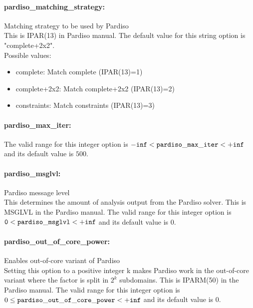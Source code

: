 \paragraph{pardiso\_matching\_strategy:}\label{sec:pardiso_matching_strategy} Matching strategy to be used by Pardiso $\;$ \\
 This is IPAR(13) in Pardiso manual.
The default value for this string option is "complete+2x2".
\\ 
Possible values:
\begin{itemize}
   \item complete: Match complete (IPAR(13)=1)
   \item complete+2x2: Match complete+2x2 (IPAR(13)=2)
   \item constraints: Match constraints (IPAR(13)=3)
\end{itemize}

\paragraph{pardiso\_max\_iter:}\label{sec:pardiso_max_iter}  $\;$ \\
 The valid range for this integer option is
${\tt -inf} <  {\tt pardiso\_max\_iter } <  {\tt +inf}$
and its default value is $500$.

\paragraph{pardiso\_msglvl:}\label{sec:pardiso_msglvl} Pardiso message level $\;$ \\
This determines the amount of analysis output from the Pardiso solver.
This is MSGLVL in the Pardiso manual.
 The valid range for this integer option is
${\tt 0} <  {\tt pardiso\_msglvl } <  {\tt +inf}$
and its default value is $0$.

\paragraph{pardiso\_out\_of\_core\_power:}\label{sec:pardiso_out_of_core_power} Enables out-of-core variant of Pardiso $\;$ \\
 Setting this option to a positive integer k makes
Pardiso work in the out-of-core variant where the
factor is split in $2^k$ subdomains.  This is
IPARM(50) in the Pardiso manual. The valid range for this integer option is
$0 \le {\tt pardiso\_out\_of\_core\_power } <  {\tt +inf}$
and its default value is $0$.


